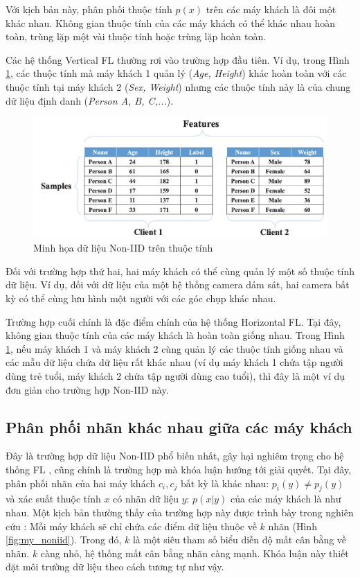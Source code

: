 Với kịch bản này, phân phối thuộc tính $p(x)$ trên các máy khách là đôi một khác nhau. Không gian thuộc tính của các máy khách có thể khác nhau hoàn toàn, trùng lặp một vài thuộc tính hoặc trùng lặp hoàn toàn.

Các hệ thống Vertical FL thường rơi vào trường hợp đầu tiên. Ví dụ, trong Hình \ref{fig:vertical_fl}, các thuộc tính mà máy khách 1 quản lý (\textit{Age, Height}) khác hoàn toàn với các thuộc tính tại máy khách 2 (\textit{Sex, Weight}) nhưng các thuộc tính này là của chung dữ liệu định danh (\textit{Person A, B, C,...}).

\begin{figure}[H]
    \centering
    \includegraphics[scale=0.6]{../images/vertical_fl.png}
    \caption{Minh họa dữ liệu Non-IID trên thuộc tính \cite{zhu2021federated}}
    \label{fig:vertical_fl}
\end{figure}

Đối với trường hợp thứ hai, hai máy khách có thể cùng quản lý một số thuộc tính dữ liệu. Ví dụ, đối với dữ liệu của một hệ thống camera dám sát, hai camera bất kỳ có thể cùng lưu hình một người với các góc chụp khác nhau.

Trường hợp cuối chính là đặc điểm chính của hệ thống Horizontal FL. Tại đây, không gian thuộc tính của các máy khách là hoàn toàn giống nhau. Trong Hình \ref{fig:vertical_fl}, nếu máy khách 1 và máy khách 2 cùng quản lý các thuộc tính giống nhau và các mẫu dữ liệu chứa dữ liệu rất khác nhau (ví dụ máy khách 1 chứa tập người dùng trẻ tuổi, máy khách 2 chứa tập người dùng cao tuổi), thì đây là một ví dụ đơn giản cho trường hợp Non-IID này.

\subsection{Phân phối nhãn khác nhau giữa các máy khách}

Đây là trường hợp dữ liệu Non-IID phổ biến nhất, gây hại nghiêm trọng cho hệ thống FL \cite{zhu2021federated}, cũng chính là trường hợp mà khóa luận hướng tới giải quyết. Tại đây, phân phối nhãn của hai máy khách $c_i, c_j$ bất kỳ là khác nhau: $p_i(y) \ne p_j(y)$ và xác suất thuộc tính $x$ có nhãn dữ liệu $y$: $p(x|y)$ của các máy khách là như nhau. Một kịch bản thường thấy của trường hợp này được trình bày trong nghiên cứu \cite{mcmahan2017communication}: Mỗi máy khách sẽ chỉ chứa các điểm dữ liệu thuộc về $k$ nhãn (Hình \ref{fig:my_noniid}). Trong đó, $k$ là một siêu tham số biểu diễn độ mất cân bằng về nhãn. $k$ càng nhỏ, hệ thống mất cân bằng nhãn càng mạnh. Khóa luận này thiết đặt môi trường dữ liệu theo cách tương tự như vậy.

